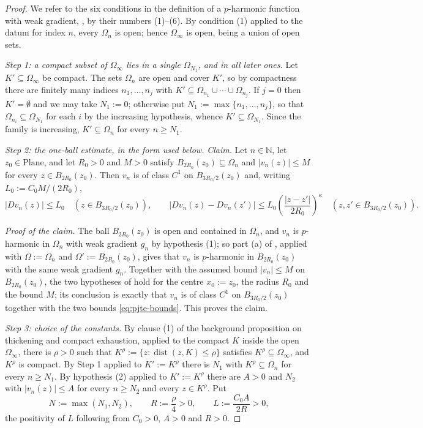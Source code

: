 \begin{proof}
We refer to the six conditions in the definition of a $p$-harmonic function with weak gradient,
, by their numbers (1)--(6).  By condition (1) applied to the datum for index
$n$, every $\Omega_n$ is open; hence $\Omega_\infty$ is open, being a union of open sets.

\medskip\noindent\emph{Step 1: a compact subset of $\Omega_\infty$ lies in a single
$\Omega_{N_1}$, and in all later ones.}
Let $K'\subseteq\Omega_\infty$ be compact.  The sets $\Omega_n$ are open and cover $K'$, so by
compactness there are finitely many indices $n_1,\ldots,n_j$ with
$K'\subseteq\Omega_{n_1}\cup\cdots\cup\Omega_{n_j}$.  If $j=0$ then $K'=\emptyset$ and we may
take $N_1:=0$; otherwise put $N_1:=\max\{n_1,\ldots,n_j\}$, so that
$\Omega_{n_i}\subseteq\Omega_{N_1}$ for each $i$ by the increasing hypothesis, whence
$K'\subseteq\Omega_{N_1}$.  Since the family is increasing, $K'\subseteq\Omega_n$ for every
$n\ge N_1$.

\medskip\noindent\emph{Step 2: the one-ball estimate, in the form used below.}
\emph{Claim.}  Let $n\in\mathbb{N}$, let $z_0\in\mathrm{Plane}$, and let $R_0>0$ and $M>0$
satisfy $B_{2R_0}(z_0)\subseteq\Omega_n$ and $\lvert v_n(z)\rvert\le M$ for every
$z\in B_{2R_0}(z_0)$.  Then $v_n$ is of class $C^{1}$ on $B_{3R_0/2}(z_0)$ and, writing
$L_0:=C_0M/(2R_0)$,
\begin{equation}\label{eq:pjte-bounds}
  \lvert Dv_n(z)\rvert\le L_0\quad(z\in B_{3R_0/2}(z_0)),\qquad
  \lvert Dv_n(z)-Dv_n(z')\rvert\le L_0\left(\frac{\lvert z-z'\rvert}{2R_0}\right)^{\kappa}
  \quad(z,z'\in B_{3R_0/2}(z_0)).
\end{equation}

\emph{Proof of the claim.}  The ball $B_{2R_0}(z_0)$ is open and contained in $\Omega_n$, and
$v_n$ is $p$-harmonic in $\Omega_n$ with weak gradient $g_n$ by hypothesis (1); so part (a) of
, applied with $\Omega:=\Omega_n$ and $\Omega':=B_{2R_0}(z_0)$, gives
that $v_n$ is $p$-harmonic in $B_{2R_0}(z_0)$ with the same weak gradient $g_n$.  Together with
the assumed bound $\lvert v_n\rvert\le M$ on $B_{2R_0}(z_0)$, the two hypotheses of
 hold for the centre $x_0:=z_0$, the radius $R_0$ and the
bound $M$; its conclusion is exactly that $v_n$ is of class $C^{1}$ on $B_{3R_0/2}(z_0)$
together with the two bounds \eqref{eq:pjte-bounds}.  This proves the claim.

\medskip\noindent\emph{Step 3: choice of the constants.}
By clause (1) of the background proposition on thickening and compact exhaustion, applied to the
compact $K$ inside the open $\Omega_\infty$, there is $\rho>0$ such that
$K^{\rho}:=\{z:\operatorname{dist}(z,K)\le\rho\}$ satisfies $K^{\rho}\subseteq\Omega_\infty$,
and $K^{\rho}$ is compact.  By Step 1 applied to $K':=K^{\rho}$ there is $N_1$ with
$K^{\rho}\subseteq\Omega_n$ for every $n\ge N_1$.  By hypothesis (2) applied to $K':=K^{\rho}$
there are $A>0$ and $N_2$ with $\lvert v_n(z)\rvert\le A$ for every $n\ge N_2$ and every
$z\in K^{\rho}$.  Put
\[
  N:=\max(N_1,N_2),\qquad R:=\frac{\rho}{4}>0,\qquad L:=\frac{C_0A}{2R}>0 ,
\]
the positivity of $L$ following from $C_0>0$, $A>0$ and $R>0$.


\end{proof}
